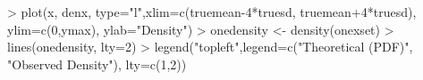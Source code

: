 \begin{Schunk}
\begin{Sinput}
> plot(x, denx, type="l",xlim=c(truemean-4*truesd, truemean+4*truesd), ylim=c(0,ymax), ylab="Density")
> onedensity <- density(onexset)
> lines(onedensity, lty=2)
> legend("topleft",legend=c("Theoretical (PDF)", "Observed Density"), lty=c(1,2))
\end{Sinput}
\end{Schunk}
